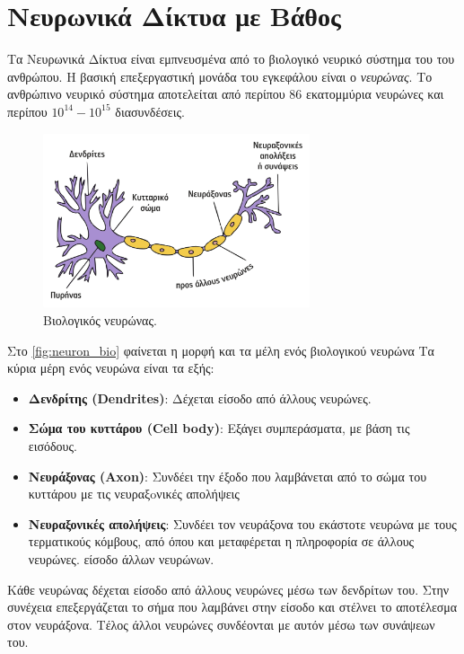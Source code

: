\section{Νευρωνικά Δίκτυα με Βάθος}
\label{sec:theory_dnn}

Τα Νευρωνικά Δίκτυα είναι εμπνευσμένα από το βιολογικό νευρικό σύστημα του
του ανθρώπου. Η βασική επεξεργαστική μονάδα του εγκεφάλου είναι ο \emph{νευρώνας}.
Το ανθρώπινο νευρικό σύστημα αποτελείται από περίπου 86 εκατομμύρια νευρώνες και περίπου
$10^14 - 10^15$ διασυνδέσεις.
\begin{figure}[!ht]
  \centering
  \includegraphics[width=0.7\textwidth]{./images/chapter3/neuron.png}
  \caption[Βιολογικός Νευρώνας]{Βιολογικός νευρώνας.}
  \label{fig:neuron_bio}
\end{figure}
Στο \autoref{fig:neuron_bio} φαίνεται η μορφή και τα μέλη ενός βιολογικού νευρώνα
Τα κύρια μέρη ενός νευρώνα είναι τα εξής:
\begin{itemize}
  \item{\textbf{Δενδρίτης (Dendrites)}: Δέχεται είσοδο από άλλους νευρώνες.}
  \item{\textbf{Σώμα του κυττάρου (Cell body)}: Εξάγει συμπεράσματα, με βάση τις εισόδους.}
  \item{\textbf{Νευράξονας (Axon)}: Συνδέει την έξοδο που λαμβάνεται από το σώμα του κυττάρου με τις νευραξoνικές απολήψεις}
  \item{\textbf{Νευραξονικές απολήψεις}: Συνδέει τον νευράξονα του εκάστοτε νευρώνα με τους τερματικούς κόμβους,
    από όπου και μεταφέρεται η πληροφορία σε άλλους νευρώνες.
    είσοδο άλλων νευρώνων.}
\end{itemize}
Κάθε νευρώνας δέχεται είσοδο από άλλους νευρώνες μέσω των δενδρίτων του.
Στην συνέχεια επεξεργάζεται το σήμα που λαμβάνει στην είσοδο και
στέλνει το αποτέλεσμα στον νευράξονα. Τέλος άλλοι νευρώνες συνδέονται με αυτόν
μέσω των συνάψεων του.

